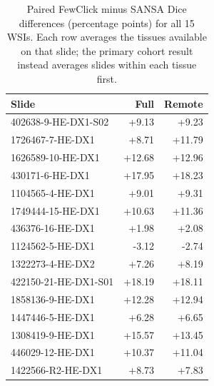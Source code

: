 \begin{table}[t]
\centering
\caption{Paired FewClick minus SANSA Dice differences (percentage points) for all 15 WSIs. Each row averages the tissues available on that slide; the primary cohort result instead averages slides within each tissue first.}
\label{tab:wsi_paired_slides}
\small\setlength{\tabcolsep}{4pt}
\begin{tabular}{@{}lrr@{}}
\toprule
Slide & Full & Remote \\
\midrule
402638-9-HE-DX1-S02 & +9.13 & +9.23 \\
1726467-7-HE-DX1 & +8.71 & +11.79 \\
1626589-10-HE-DX1 & +12.68 & +12.96 \\
430171-6-HE-DX1 & +17.95 & +18.23 \\
1104565-4-HE-DX1 & +9.01 & +9.31 \\
1749444-15-HE-DX1 & +10.63 & +11.36 \\
436376-16-HE-DX1 & +1.98 & +2.08 \\
1124562-5-HE-DX1 & -3.12 & -2.74 \\
1322273-4-HE-DX2 & +7.26 & +8.19 \\
422150-21-HE-DX1-S01 & +18.19 & +18.11 \\
1858136-9-HE-DX1 & +12.28 & +12.94 \\
1447446-5-HE-DX1 & +6.28 & +6.65 \\
1308419-9-HE-DX1 & +15.57 & +13.45 \\
446029-12-HE-DX1 & +10.37 & +11.04 \\
1422566-R2-HE-DX1 & +8.73 & +7.83 \\
\bottomrule
\end{tabular}
\end{table}
